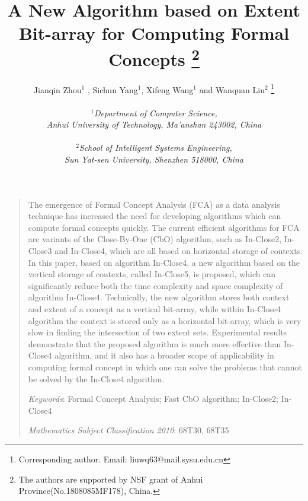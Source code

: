 \documentclass[11pt]{article}
\numberwithin{equation}{subsection}
\begin{document}
\title{\textbf{A New Algorithm based on Extent Bit-array for Computing  Formal Concepts
\footnote{The
authors are supported by   NSF grant of
 Anhui Province(No.1808085MF178), China.} }}
\author{Jianqin Zhou$^{1}$ , Sichun Yang$^{1}$,  Xifeng Wang$^{1}$ and Wanquan Liu$^{2}$ \footnote{Corresponding author.  Email: liuwq63@mail.sysu.edu.cn}\\
\\
\textit{$^{1}$Department of Computer Science,} \\
\textit{Anhui University of   Technology, Ma'anshan 243002,   China}\\
\\
\textit{$^{2}$School of Intelligent Systems Engineering,} \\
\textit{Sun Yat-sen University, Shenzhen 518000,  China}}
\date{ }
\maketitle
\begin{quotation}
\small\noindent

The emergence of Formal Concept Analysis (FCA) as a data analysis technique  has increased the need for developing algorithms which can compute formal concepts quickly. The current efficient algorithms for FCA are variants of the Close-By-One (CbO) algorithm, such as In-Close2, In-Close3 and In-Close4, which are all based on horizontal storage of contexts. In this paper, based on algorithm In-Close4, a new algorithm based on the vertical storage of contexts, called In-Close5, is proposed, which can significantly reduce both the time complexity and space complexity of algorithm In-Close4. Technically, the new algorithm stores both context and extent of a concept as a vertical bit-array, while within In-Close4  algorithm the context is stored only as a horizontal bit-array, which is very slow in finding the intersection of two extent sets.
Experimental results demonstrate that the proposed algorithm is much more effective than In-Close4  algorithm, and it also has a broader scope of applicability
in computing  formal concept in which one can solve the problems that cannot be solved by the In-Close4 algorithm.

\noindent\textit {Keywords}: Formal Concept Analysis; Fast CbO algorithm; In-Close2; In-Close4


\noindent \textit{Mathematics Subject Classification 2010}: 68T30,
68T35

\end{quotation}
\end{document}
